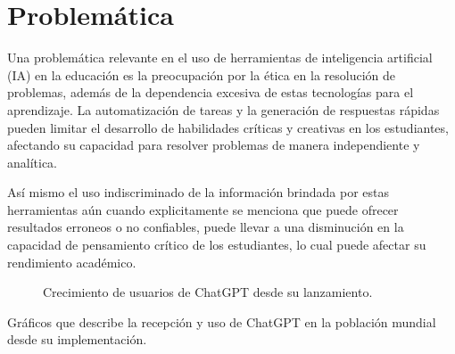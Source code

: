 \section{Problemática}

  Una problemática relevante en el uso de herramientas de inteligencia artificial (IA) en la educación es la preocupación por la ética en la resolución de problemas, además de la dependencia excesiva de estas tecnologías para el aprendizaje. La automatización de tareas y la generación de respuestas rápidas pueden limitar el desarrollo de habilidades críticas y creativas en los estudiantes, afectando su capacidad para resolver problemas de manera independiente y analítica.

  Así mismo el uso indiscriminado de la información brindada por estas herramientas aún cuando explicitamente se menciona que puede ofrecer resultados erroneos o no confiables, puede llevar a una disminución en la capacidad de pensamiento crítico de los estudiantes, lo cual puede afectar su rendimiento académico.
  
  \begin{figure}[ht]
    \centering
    \caption{Crecimiento de usuarios de ChatGPT desde su lanzamiento.}
    \label{fig:usuarios_chatgpt}
  \end{figure}
    Gráficos que describe la recepción y uso de ChatGPT en la población mundial desde su implementación.